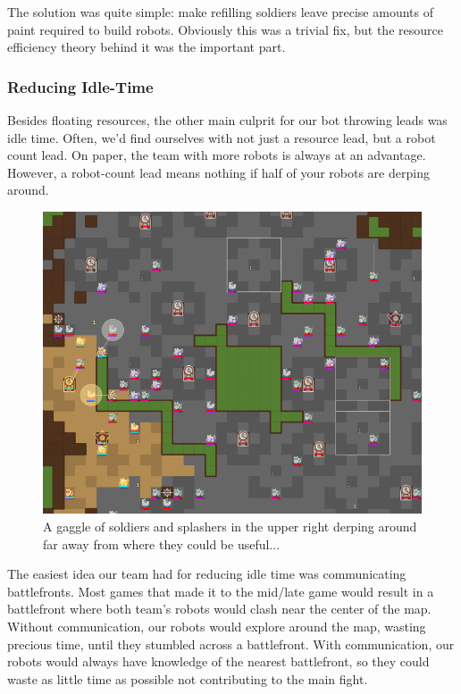 \medskip

The solution was quite simple: make refilling soldiers leave precise amounts of paint required to build robots. Obviously this was a trivial fix, but the resource efficiency theory behind it was the important part.

\subsubsection{Reducing Idle-Time}

Besides floating resources, the other main culprit for our bot throwing leads was idle time. Often, we'd find ourselves with not just a resource lead, but a robot count lead. On paper, the team with more robots is always at an advantage. However, a robot-count lead means nothing if half of your robots are derping around.

\begin{figure}[H]
    \centering
    \includegraphics[scale=0.5]{images/idle_time.png}
    \caption{A gaggle of soldiers and splashers in the upper right derping around far away from where they could be useful...}
\end{figure}

The easiest idea our team had for reducing idle time was communicating battlefronts. Most games that made it to the mid/late game would result in a battlefront where both team's robots would clash near the center of the map. Without communication, our robots would explore around the map, wasting precious time, until they stumbled across a battlefront. With communication, our robots would always have knowledge of the nearest battlefront, so they could waste as little time as possible not contributing to the main fight.

